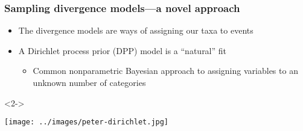 \begin{frame}[t]
    \frametitle{Sampling divergence models---a novel approach}
    \begin{itemize}[<+->]
        \item The divergence models are ways of assigning our taxa to events
        \item A Dirichlet process prior (DPP) model is a ``natural'' fit
            \begin{itemize}[<+->]
                \item Common nonparametric Bayesian approach to assigning
                    variables to an unknown number of categories
            \end{itemize}
    \end{itemize}

    \begin{uncoverenv}<2->
    \begin{center}
        \texttt{[image: ../images/peter-dirichlet.jpg]}
    \end{center}
    \end{uncoverenv}
\end{frame}

